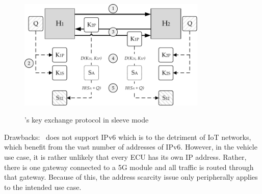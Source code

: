 \begin{figure}[htpb]
  \centering
  \includegraphics[width=0.8\textwidth]{figures/weave-encryption.pdf}
  \caption[Weave's key exchange protocol]{\wnet 's key exchange protocol in sleeve mode}\label{fig:weaveencryption}
\end{figure}


Drawbacks: \wnet\ does not support IPv6 which is to the detriment of IoT networks, which benefit from the vast number of addresses of IPv6. However, in the vehicle use case, it is rather unlikely that every ECU has its own IP address. Rather, there is one gateway connected to a 5G module and all traffic is routed through that gateway. Because of this, the address scarcity issue only peripherally applies to the intended use case.